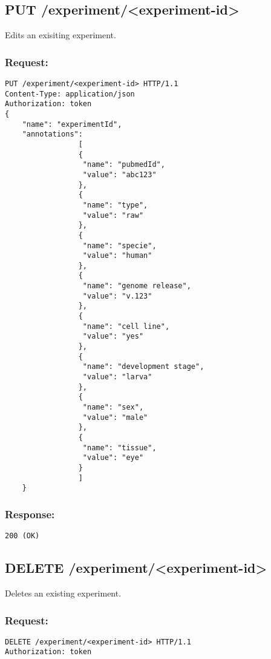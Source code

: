 \subsection*{PUT /experiment/<experiment-id>}

Edits an exisiting experiment.

\subsubsection*{Request:}
\begin{verbatim}
PUT /experiment/<experiment-id> HTTP/1.1
Content-Type: application/json
Authorization: token
{
    "name": "experimentId",
    "annotations": 
                 [
                 {
                  "name": "pubmedId",
                  "value": "abc123"
                 }, 
                 {
                  "name": "type",
                  "value": "raw"
                 },
                 {
                  "name": "specie",
                  "value": "human"
                 },
                 {
                  "name": "genome release",
                  "value": "v.123"
                 },
                 {
                  "name": "cell line",
                  "value": "yes"
                 },
                 {
                  "name": "development stage",
                  "value": "larva"
                 },
                 {
                  "name": "sex",
                  "value": "male"
                 },
                 {
                  "name": "tissue",
                  "value": "eye"
                 }
                 ]
    }
\end{verbatim}

\subsubsection*{Response:}
\begin{verbatim}
200 (OK)
\end{verbatim}

\subsection*{DELETE /experiment/<experiment-id>}

Deletes an existing experiment.

\subsubsection*{Request:}
\begin{verbatim}
DELETE /experiment/<experiment-id> HTTP/1.1
Authorization: token
\end{verbatim}

